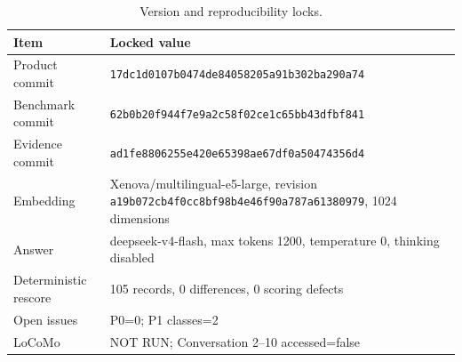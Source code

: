 \begin{table}[t]
\centering\small
\caption{Version and reproducibility locks.}
\label{tab:reproducibility}
\begin{tabular}{lp{}}
\toprule Item & Locked value \\
\midrule
Product commit & \texttt{17dc1d0107b0474de84058205a91b302ba290a74} \\
Benchmark commit & \texttt{62b0b20f944f7e9a2c58f02ce1c65bb43dfbf841} \\
Evidence commit & \texttt{ad1fe8806255e420e65398ae67df0a50474356d4} \\
Embedding & Xenova/multilingual-e5-large, revision \texttt{a19b072cb4f0cc8bf98b4e46f90a787a61380979}, 1024 dimensions \\
Answer & deepseek-v4-flash, max tokens 1200, temperature 0, thinking disabled \\
Deterministic rescore & 105 records, 0 differences, 0 scoring defects \\
Open issues & P0=0; P1 classes=2 \\
LoCoMo & NOT RUN; Conversation 2--10 accessed=false \\
\bottomrule
\end{tabular}
\end{table}
